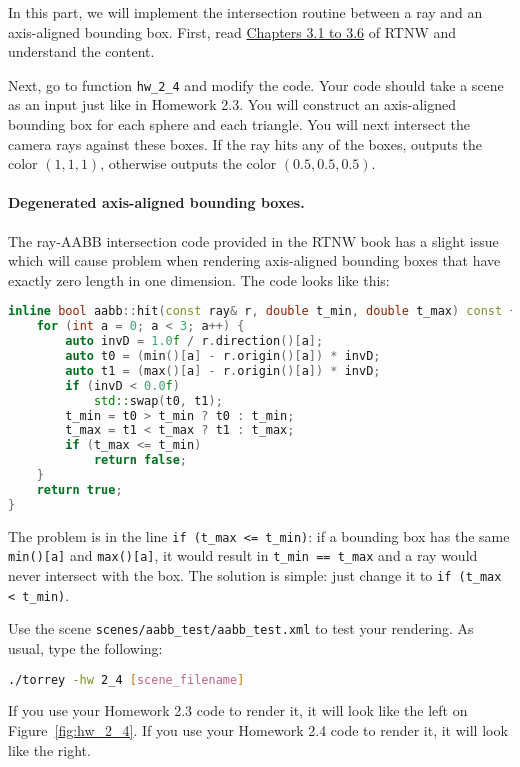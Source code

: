In this part, we will implement the intersection routine between a ray and an axis-aligned bounding box. First, read \href{https://raytracing.github.io/books/RayTracingTheNextWeek.html#boundingvolumehierarchies}{Chapters 3.1 to 3.6} of RTNW and understand the content.

Next, go to function \lstinline{hw_2_4} and modify the code. Your code should take a scene as an input just like in Homework 2.3. You will construct an axis-aligned bounding box for each sphere and each triangle. You will next intersect the camera rays against these boxes. If the ray hits any of the boxes, outputs the color $(1, 1, 1)$, otherwise outputs the color $(0.5, 0.5, 0.5)$.

\paragraph{Degenerated axis-aligned bounding boxes.}
The ray-AABB intersection code provided in the RTNW book has a slight issue which will cause problem when rendering axis-aligned bounding boxes that have exactly zero length in one dimension. The code looks like this:
\begin{lstlisting}[language=C++]
inline bool aabb::hit(const ray& r, double t_min, double t_max) const {
    for (int a = 0; a < 3; a++) {
        auto invD = 1.0f / r.direction()[a];
        auto t0 = (min()[a] - r.origin()[a]) * invD;
        auto t1 = (max()[a] - r.origin()[a]) * invD;
        if (invD < 0.0f)
            std::swap(t0, t1);
        t_min = t0 > t_min ? t0 : t_min;
        t_max = t1 < t_max ? t1 : t_max;
        if (t_max <= t_min)
            return false;
    }
    return true;
}
\end{lstlisting}
The problem is in the line \lstinline{if (t_max <= t_min)}: if a bounding box has the same \lstinline{min()[a]} and \lstinline{max()[a]}, it would result in \lstinline{t_min == t_max} and a ray would never intersect with the box. The solution is simple: just change it to \lstinline{if (t_max < t_min)}.

Use the scene \lstinline{scenes/aabb_test/aabb_test.xml} to test your rendering. As usual, type the following:
\begin{lstlisting}[language=bash]
./torrey -hw 2_4 [scene_filename]
\end{lstlisting}
If you use your Homework 2.3 code to render it, it will look like the left on Figure~\ref{fig:hw_2_4}. If you use your Homework 2.4 code to render it, it will look like the right.

